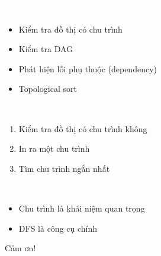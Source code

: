 \documentclass{beamer}
\newcommand{\hlorange}[1]{\textcolor{myorange}{#1}}
\newcommand{\hlwhite}[1]{\textcolor{white}{#1}}
\begin{document}
\begin{frame}{\hlwhite{Ứng dụng}}
\begin{itemize}
\item Kiểm tra đồ thị có chu trình
\item Kiểm tra DAG
\item Phát hiện lỗi phụ thuộc (dependency)
\item Topological sort
\end{itemize}
\end{frame}

\begin{frame}{\hlwhite{Bài tập}}
\begin{enumerate}
\item Kiểm tra đồ thị có chu trình không
\item In ra một chu trình
\item Tìm chu trình ngắn nhất
\end{enumerate}
\end{frame}

\begin{frame}{\hlwhite{Kết luận}}
\begin{itemize}
\item Chu trình là khái niệm quan trọng
\item DFS là công cụ chính
\end{itemize}

\bigskip
\centerline{\hlorange{Cảm ơn!}}
\end{frame}
\end{document}
